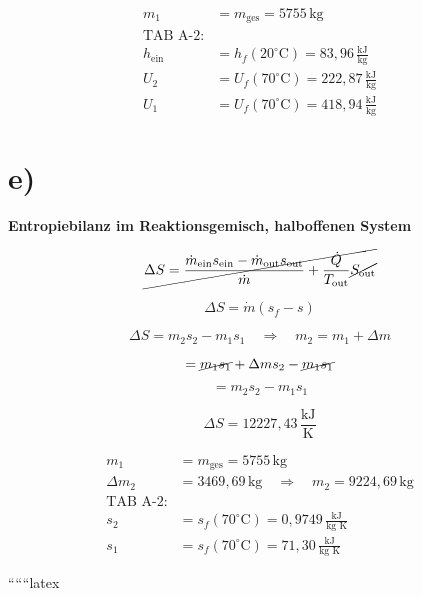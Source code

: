 \[
\begin{aligned}
    m_1 &= m_{\text{ges}} = 5755 \, \text{kg} \\
    \text{TAB A-2:} \\
    h_{\text{ein}} &= h_f (20^\circ \text{C}) = 83,96 \, \frac{\text{kJ}}{\text{kg}} \\
    U_2 &= U_f (70^\circ \text{C}) = 222,87 \, \frac{\text{kJ}}{\text{kg}} \\
    U_1 &= U_f (70^\circ \text{C}) = 418,94 \, \frac{\text{kJ}}{\text{kg}}
\end{aligned}
\]

\section*{e)}

\textbf{Entropiebilanz im Reaktionsgemisch, halboffenen System}

\[
\cancel{\Delta S = \frac{\dot{m}_{\text{ein}} s_{\text{ein}} - \dot{m}_{\text{out}} s_{\text{out}}}{\dot{m}} + \frac{\dot{Q}}{T_{\text{out}}} \cancel{S_{\text{out}}}}
\]

\[
\Delta S = \dot{m} (s_f - s)
\]

\[
\Delta S = m_2 s_2 - m_1 s_1 \quad \Rightarrow \quad m_2 = m_1 + \Delta m
\]

\[
= \cancel{m_1 s_1} + \Delta m s_2 - \cancel{m_1 s_1}
\]

\[
= m_2 s_2 - m_1 s_1
\]

\[
\Delta S = 12227,43 \, \frac{\text{kJ}}{\text{K}}
\]

\[
\begin{aligned}
    m_1 &= m_{\text{ges}} = 5755 \, \text{kg} \\
    \Delta m_2 &= 3469,69 \, \text{kg} \quad \Rightarrow \quad m_2 = 9224,69 \, \text{kg} \\
    \text{TAB A-2:} \\
    s_2 &= s_f (70^\circ \text{C}) = 0,9749 \, \frac{\text{kJ}}{\text{kg K}} \\
    s_1 &= s_f (70^\circ \text{C}) = 71,30 \, \frac{\text{kJ}}{\text{kg K}}
\end{aligned}
\]

``````latex


